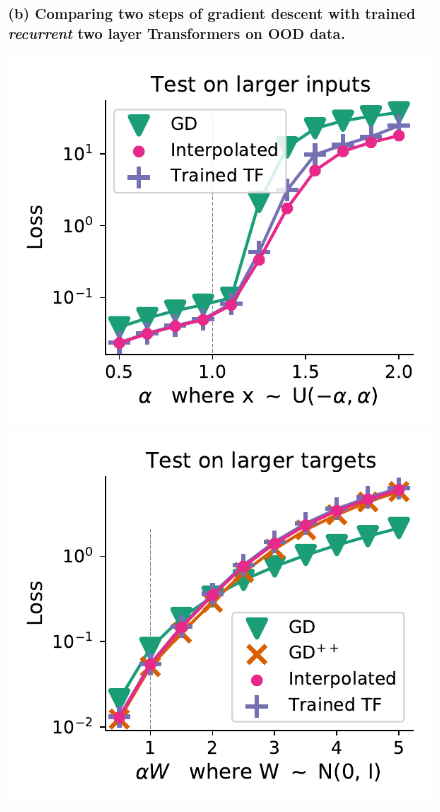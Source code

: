 \documentclass{article}
\theoremstyle{plain}
\theoremstyle{definition}
\theoremstyle{remark}
\begin{document}
\begin{figure}
\begin{center}
\end{center}
\textbf{(b) Comparing two steps of gradient descent with trained \textit{recurrent} two layer Transformers on OOD data.}

\begin{center}
\begin{minipage}{.24\textwidth}
  \centering
  \begin{center}
    \includegraphics[width=1.\textwidth]{Final_figures/linear/two_layers_rec/normal_11.pdf}
  \end{center}
  \vspace{-10pt}
\end{minipage}
\begin{minipage}{.24\textwidth}
  \centering
  \begin{center}
    \includegraphics[width=1.\textwidth]{Final_figures/linear/two_layers_rec/normal_13.pdf}

\end{center}
\end{minipage}
\end{center}
\end{figure}
\end{document}
